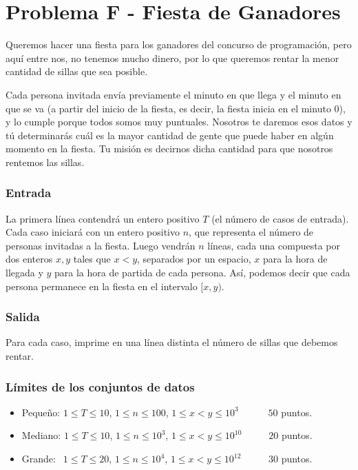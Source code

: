 \chapter*{Problema F - Fiesta de Ganadores}

Queremos hacer una fiesta para los ganadores del concurso
de programación, pero aquí entre nos, no tenemos mucho 
dinero, por lo que queremos rentar la menor cantidad de
sillas que sea posible. 

Cada persona invitada envía previamente el minuto en que
llega y el minuto en que se va (a partir del inicio de la 
fiesta, es decir, la fiesta inicia en el minuto 0), y lo 
cumple porque todos somos muy puntuales. Nosotros te 
daremos esos datos y tú determinarás cuál es la mayor 
cantidad de gente que puede haber en algún momento en la 
fiesta. Tu misión es decirnos dicha cantidad para que 
nosotros rentemos las sillas.



\subsection*{Entrada}
La primera línea contendrá un entero positivo $T$ (el 
número de casos de entrada). Cada caso iniciará con un
entero positivo $n$, que representa el número de personas 
invitadas a la fiesta. Luego vendrán $n$ líneas, cada una
compuesta por dos enteros $x, y$ tales que $x < y$,
separados por un espacio, $x$ para la hora de llegada y 
$y$ para la hora de partida de cada persona. Así, podemos
decir que cada persona permanece en la fiesta en el
intervalo $[x,y)$.



\subsection*{Salida}
Para cada caso, imprime en una línea distinta el número 
de sillas que debemos rentar.



\subsection*{Límites de los conjuntos de datos}

\begin{itemize}
    \item Pequeño: $ 1 \leq T \leq 10 $, $ 1 \leq n \leq
    100 $, $ 1 \leq x < y \leq 10^3$   $\quad \;\;\;\;\;$
    $50$ puntos.
    \item Mediano: $ 1 \leq T \leq 10 $, $ 1 \leq n \leq
    10^3 $, $ 1 \leq x < y \leq 10^{10}$ $\quad\;\;\;\;$ 
    $20$ puntos.
    \item Grande: $ \;\, 1 \leq T \leq 20$, $ 1 \leq n 
    \leq 10^4 $, $ 1 \leq x < y \leq 10^{12} $ $\quad 
    \quad \,$ $30$ puntos.
\end{itemize}



